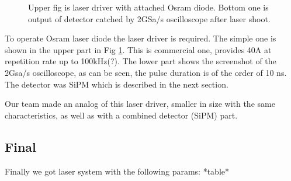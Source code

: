 \noindent\begin{minipage}{0.5\textwidth}
\begin{figure}[H]
\vspace{-3mm}
\caption{Upper fig is laser driver with attached Osram diode. Bottom one is output of detector catched by 2GSa/s oscilloscope after laser shoot. }
\label{fig:laser_driver}
\end{figure}
\end{minipage}
\hfill
\begin{minipage}{0.4\textwidth}

To operate Osram laser diode the laser driver is required. The simple one is shown in the upper part in Fig \ref{fig:laser_driver}.
This is commercial one, provides 40A at repetition rate up to 100kHz(?).
The lower part shows the screenshot of the 2Gsa/s oscilloscope, as can be seen, the pulse duration is of the order of 10 ns. The detector was SiPM which is described in the next section.

Our team made an analog of this laser driver, smaller in size with the same characteristics, as well as with a combined detector (SiPM) part. 

\subsection{Final}
Finally we got laser system with the following params:
*table*


\end{minipage}

